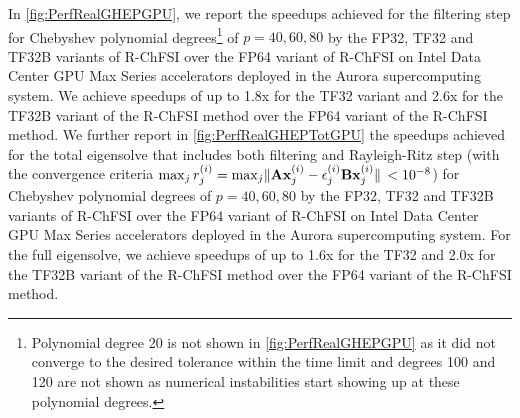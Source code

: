 \documentclass[preprint,3p,number,sort&compress]{elsarticle}
\newcommand{\bx}{\textbf{x}}
\newcommand{\bA}{\textbf{A}}
\newcommand{\bB}{\textbf{B}}
\DeclarePairedDelimiter\norm{\lVert}{\rVert\,}%
\begin{document}
In \cref{fig:PerfRealGHEPGPU}, we report the speedups achieved for the filtering step for Chebyshev polynomial degrees\footnote{Polynomial degree 20 is not shown in \cref{fig:PerfRealGHEPGPU} as it did not converge to the desired tolerance within the time limit and degrees 100 and 120 are not shown as numerical instabilities start showing up at these polynomial degrees.} of $p=40,60,80$ by the FP32, TF32 and TF32B variants of R-ChFSI over the FP64 variant of R-ChFSI on Intel Data Center GPU Max Series accelerators deployed in the Aurora supercomputing system. We achieve speedups of up to 1.8x for the TF32 variant and 2.6x for the TF32B variant of the R-ChFSI method over the FP64 variant of the R-ChFSI method. We further report in \cref{fig:PerfRealGHEPTotGPU} the speedups achieved for the total eigensolve that includes both filtering and Rayleigh-Ritz step (with the convergence criteria $\max_j r_j^{(i)}=\max_j\norm{\bA\bx_j^{(i)}-\epsilon_j^{(i)}\bB\bx_j^{(i)}}<10^{-8}$) for Chebyshev polynomial degrees of $p=40,60,80$ by the FP32, TF32 and TF32B variants of R-ChFSI over the FP64 variant of R-ChFSI on Intel Data Center GPU Max Series accelerators deployed in the Aurora supercomputing system. For the full eigensolve, we achieve speedups of up to 1.6x for the TF32 and 2.0x for the TF32B variant of the R-ChFSI method over the FP64 variant of the R-ChFSI method.
\end{document}
